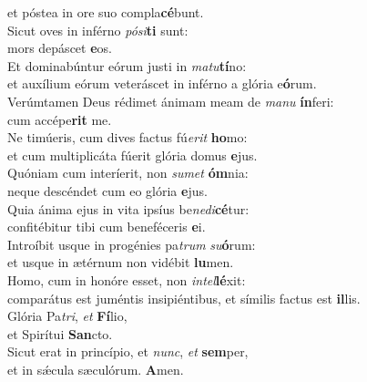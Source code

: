 \oddverse et póstea in ore suo compla\textbf{cé}bunt.\\
\evenverse Sicut oves in inférno \textit{pó}\textit{si}\textbf{ti} sunt:~\*\\
\evenverse mors depáscet \textbf{e}os.\\
\oddverse Et dominabúntur eórum justi in \textit{ma}\textit{tu}\textbf{tí}no:~\*\\
\oddverse et auxílium eórum veteráscet in inférno a glória e\textbf{ó}rum.\\
\evenverse Verúmtamen Deus rédimet ánimam meam de \textit{ma}\textit{nu} \textbf{ín}feri:~\*\\
\evenverse cum accépe\textbf{rit} me.\\
\oddverse Ne timúeris, cum dives factus fú\textit{e}\textit{rit} \textbf{ho}mo:~\*\\
\oddverse et cum multiplicáta fúerit glória domus \textbf{e}jus.\\
\evenverse Quóniam cum interíerit, non \textit{su}\textit{met} \textbf{óm}nia:~\*\\
\evenverse neque descéndet cum eo glória \textbf{e}jus.\\
\oddverse Quia ánima ejus in vita ipsíus be\textit{ne}\textit{di}\textbf{cé}tur:~\*\\
\oddverse confitébitur tibi cum beneféceris \textbf{e}i.\\
\evenverse Introíbit usque in progénies pa\textit{trum} \textit{su}\textbf{ó}rum:~\*\\
\evenverse et usque in ætérnum non vidébit \textbf{lu}men.\\
\oddverse Homo, cum in honóre esset, non \textit{in}\textit{tel}\textbf{lé}xit:~\*\\
\oddverse comparátus est juméntis insipiéntibus, et símilis factus est \textbf{il}lis.\\
\evenverse Glória Pa\textit{tri}, \textit{et} \textbf{Fí}lio,~\*\\
\evenverse et Spirítui \textbf{San}cto.\\
\oddverse Sicut erat in princípio, et \textit{nunc}, \textit{et} \textbf{sem}per,~\*\\
\oddverse et in sǽcula sæculórum. \textbf{A}men.\\
